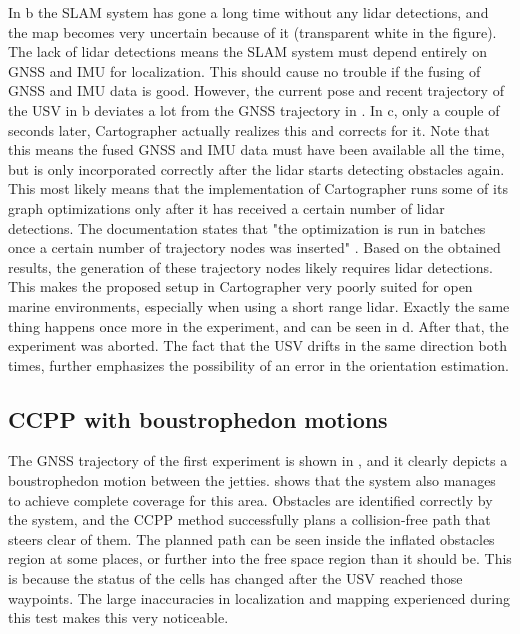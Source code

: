 In b the SLAM system has gone a long time without any lidar detections, and the map becomes very uncertain because of it (transparent white in the figure). The lack of lidar detections means the SLAM system must depend entirely on GNSS and IMU for localization. This should cause no trouble if the fusing of GNSS and IMU data is good. However, the current pose and recent trajectory of the USV in b deviates a lot from the GNSS trajectory in . In c, only a couple of seconds later, Cartographer actually realizes this and corrects for it. Note that this means the fused GNSS and IMU data must have been available all the time, but is only incorporated correctly after the lidar starts detecting obstacles again. This most likely means that the implementation of Cartographer runs some of its graph optimizations only after it has received a certain number of lidar detections.
The documentation states that "the optimization is run in batches once a certain number of trajectory nodes was inserted" \citep{website:CartographerRos}. Based on the obtained results, the generation of these trajectory nodes likely requires lidar detections. This makes the proposed setup in Cartographer very poorly suited for open marine environments, especially when using a short range lidar. Exactly the same thing happens once more in the experiment, and can be seen in d. After that, the experiment was aborted. The fact that the USV drifts in the same direction both times, further emphasizes the possibility of an error in the orientation estimation.

\subsection{CCPP with boustrophedon motions}

The GNSS trajectory of the first experiment is shown in , and it clearly depicts a  boustrophedon motion between the jetties.  shows that the system also manages to achieve complete coverage for this area. Obstacles are identified correctly by the system, and the CCPP method successfully plans a collision-free path that steers clear of them. The planned path can be seen inside the inflated obstacles region at some places, or further into the free space region than it should be. This is because the status of the cells has changed after the USV reached those waypoints. The large inaccuracies in localization and mapping experienced during this test makes this very noticeable.

